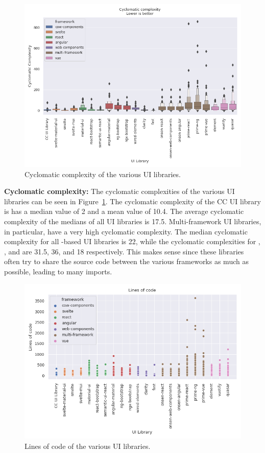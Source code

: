 \begin{figure}[h]
  \includegraphics[width=\columnwidth]{plots/cyclomatic-complexity.png}
  \caption{Cyclomatic complexity of the various UI libraries.}
  \label{fig:results:cyclomatic-complexity}
  \centering
\end{figure}

\textbf{Cyclomatic complexity:} The cyclomatic complexities of the various UI libraries can be seen in Figure~\ref{fig:results:cyclomatic-complexity}. The cyclomatic complexity of the CC UI library is has a median value of 2 and a mean value of 10.4. The average cyclomatic complexity of the medians of all UI libraries is 17.5. Multi-framework UI libraries, in particular, have a very high cyclomatic complexity. The median cyclomatic complexity for all -based UI libraries is 22, while the cyclomatic complexities for , , and  are 31.5, 36, and 18 respectively. This makes sense since these libraries often try to share the source code between the various frameworks as much as possible, leading to many imports.

\begin{figure}[h]
  \includegraphics[width=\columnwidth]{plots/lines-of-code.png}
  \caption{Lines of code of the various UI libraries.}
  \label{fig:results:lines-of-code}
  \centering
\end{figure}

